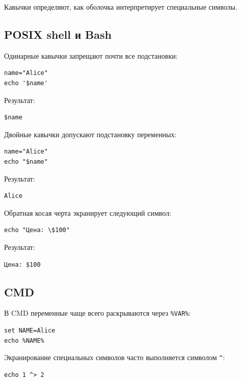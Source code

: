 \documentclass[12pt,a4paper]{article}
\begin{document}
Кавычки определяют, как оболочка интерпретирует специальные символы.

\subsection{POSIX shell и Bash}

Одинарные кавычки запрещают почти все подстановки:

\begin{lstlisting}
name="Alice"
echo '$name'
\end{lstlisting}

Результат:

\begin{lstlisting}
$name
\end{lstlisting}

Двойные кавычки допускают подстановку переменных:

\begin{lstlisting}
name="Alice"
echo "$name"
\end{lstlisting}

Результат:

\begin{lstlisting}
Alice
\end{lstlisting}

Обратная косая черта экранирует следующий символ:

\begin{lstlisting}
echo "Цена: \$100"
\end{lstlisting}

Результат:

\begin{lstlisting}
Цена: $100
\end{lstlisting}

\subsection{CMD}

В CMD переменные чаще всего раскрываются через \texttt{\%VAR\%}:

\begin{lstlisting}
set NAME=Alice
echo %NAME%
\end{lstlisting}

Экранирование специальных символов часто выполняется символом \texttt{\^}:

\begin{lstlisting}
echo 1 ^> 2
\end{lstlisting}
\end{document}

